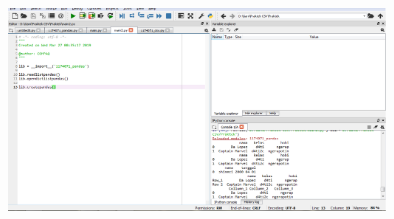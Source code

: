 \begin{figure}[ht]
	\includegraphics[width=10cm]{figures/4/1174071/Praktek/1174071_main9.png}
	\centering
\end{figure}


